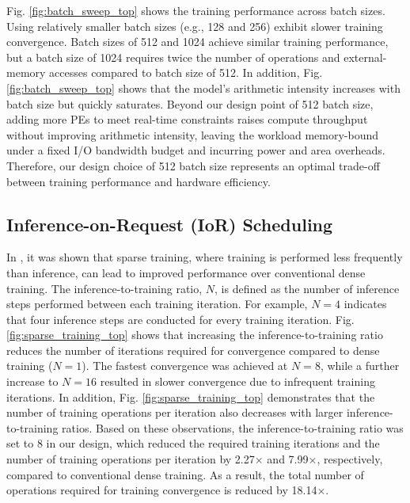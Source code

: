 Fig. \ref{fig:batch_sweep_top} shows the training performance across batch sizes. Using relatively smaller batch sizes (e.g., 128 and 256) exhibit slower training convergence. Batch sizes of 512 and 1024 achieve similar training performance, but a batch size of 1024 requires twice the number of operations and external-memory accesses compared to batch size of 512. In addition, Fig. \ref{fig:batch_sweep_top} shows that the model’s arithmetic intensity increases with batch size but quickly saturates. Beyond our design point of 512 batch size, adding more PEs to meet real-time constraints raises compute throughput without improving arithmetic intensity, leaving the workload memory-bound under a fixed I/O bandwidth budget and incurring power and area overheads. Therefore, our design choice of 512 batch size represents an optimal trade-off between training performance and hardware efficiency.

\subsection{Inference-on-Request (IoR) Scheduling}

In \cite{sparse_training}, it was shown that sparse training, where training is performed less frequently than inference, can lead to improved performance over conventional dense training. The inference-to-training ratio, $N$, is defined as the number of inference steps performed between each training iteration. For example, $N=4$ indicates that four inference steps are conducted for every training iteration. Fig. \ref{fig:sparse_training_top} shows that increasing the inference-to-training ratio reduces the number of iterations required for convergence compared to dense training ($N=1$). The fastest convergence was achieved at $N=8$, while a further increase to $N=16$ resulted in slower convergence due to infrequent training iterations. In addition, Fig. \ref{fig:sparse_training_top} demonstrates that the number of training operations per iteration also decreases with larger inference-to-training ratios. Based on these observations, the inference-to-training ratio was set to 8 in our design, which reduced the required training iterations and the number of training operations per iteration by 2.27$\times$ and 7.99$\times$, respectively, compared to conventional dense training. As a result, the total number of operations required for training convergence is reduced by 18.14$\times$.

